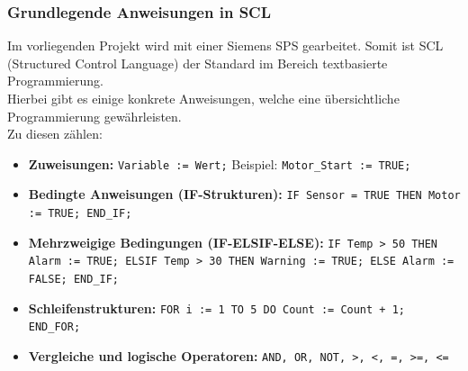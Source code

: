 \subsubsection*{Grundlegende Anweisungen in SCL}
Im vorliegenden Projekt wird mit einer Siemens SPS gearbeitet. Somit ist SCL (Structured Control Language) der Standard im Bereich textbasierte Programmierung.\\
Hierbei gibt es einige konkrete Anweisungen, welche eine übersichtliche Programmierung gewährleisten.\\
Zu diesen zählen:
\begin{itemize}
	\item \textbf{Zuweisungen:} \texttt{Variable := Wert;}  
	Beispiel: \texttt{Motor\_Start := TRUE;}
	\item \textbf{Bedingte Anweisungen (IF-Strukturen):}  
	\texttt{IF Sensor = TRUE THEN Motor := TRUE; END\_IF;}
	\item \textbf{Mehrzweigige Bedingungen (IF-ELSIF-ELSE):}  
	\texttt{IF Temp > 50 THEN Alarm := TRUE; ELSIF Temp > 30 THEN Warning := TRUE; ELSE Alarm := FALSE; END\_IF;}
	\item \textbf{Schleifenstrukturen:}  
	\texttt{FOR i := 1 TO 5 DO Count := Count + 1; END\_FOR;}
	\item \textbf{Vergleiche und logische Operatoren:}  
	\texttt{AND, OR, NOT, >, <, =, >=, <=}
\end{itemize}